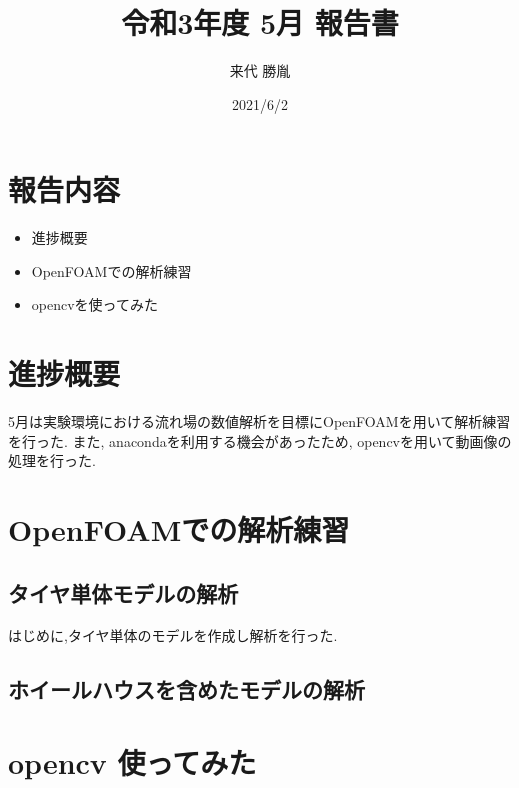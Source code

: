 \documentclass[twocolumn,a4j]{jsarticle}
\author{来代 勝胤}
\title{令和3年度 5月 報告書}
\date{2021/6/2}
\begin{document}
\columnseprule=0.1mm
\maketitle
\section*{\large 報告内容}
\begin{itemize}
    \item 進捗概要
    \item OpenFOAMでの解析練習
    \item opencvを使ってみた
\end{itemize}
\section{\large 進捗概要}
5月は実験環境における流れ場の数値解析を目標にOpenFOAMを用いて解析練習を行った.
また, anacondaを利用する機会があったため, opencvを用いて動画像の処理を行った.
\section{\large OpenFOAMでの解析練習}
\subsection{タイヤ単体モデルの解析}
はじめに,タイヤ単体のモデルを作成し解析を行った.
\subsection{ホイールハウスを含めたモデルの解析}
\section{\large opencv 使ってみた}
\end{document}
